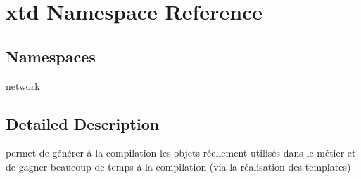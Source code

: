 \hypertarget{namespacextd}{\section{xtd Namespace Reference}
\label{namespacextd}
}
\subsection*{Namespaces}
\begin{DoxyCompactItemize}
\item 
\hyperlink{namespacextd_1_1network}{network}
\end{DoxyCompactItemize}


\subsection{Detailed Description}
permet de générer à la compilation les objets réellement utilisés dans le métier et de gagner beaucoup de temps à la compilation (via la réalisation des templates) 